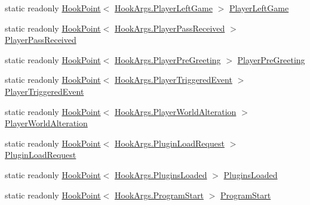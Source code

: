 \begin{DoxyCompactItemize}
static readonly \hyperlink{classOTA_1_1Plugin_1_1HookPoint}{Hook\+Point}$<$ \hyperlink{structOTA_1_1Plugin_1_1HookArgs_1_1PlayerLeftGame}{Hook\+Args.\+Player\+Left\+Game} $>$ \hyperlink{classOTA_1_1Plugin_1_1HookPoints_afa0b8296e5cf02f7938af5ab7c18f258}{Player\+Left\+Game}
\item 
static readonly \hyperlink{classOTA_1_1Plugin_1_1HookPoint}{Hook\+Point}$<$ \hyperlink{structOTA_1_1Plugin_1_1HookArgs_1_1PlayerPassReceived}{Hook\+Args.\+Player\+Pass\+Received} $>$ \hyperlink{classOTA_1_1Plugin_1_1HookPoints_adcafd753930f403b8fe614da8418ff92}{Player\+Pass\+Received}
\item 
static readonly \hyperlink{classOTA_1_1Plugin_1_1HookPoint}{Hook\+Point}$<$ \hyperlink{structOTA_1_1Plugin_1_1HookArgs_1_1PlayerPreGreeting}{Hook\+Args.\+Player\+Pre\+Greeting} $>$ \hyperlink{classOTA_1_1Plugin_1_1HookPoints_a8b500b8b4b78fdcc57640348951515c3}{Player\+Pre\+Greeting}
\item 
static readonly \hyperlink{classOTA_1_1Plugin_1_1HookPoint}{Hook\+Point}$<$ \hyperlink{structOTA_1_1Plugin_1_1HookArgs_1_1PlayerTriggeredEvent}{Hook\+Args.\+Player\+Triggered\+Event} $>$ \hyperlink{classOTA_1_1Plugin_1_1HookPoints_ab1ad9a9df05b219709cc66785f449b40}{Player\+Triggered\+Event}
\item 
static readonly \hyperlink{classOTA_1_1Plugin_1_1HookPoint}{Hook\+Point}$<$ \hyperlink{structOTA_1_1Plugin_1_1HookArgs_1_1PlayerWorldAlteration}{Hook\+Args.\+Player\+World\+Alteration} $>$ \hyperlink{classOTA_1_1Plugin_1_1HookPoints_ae335de5d246df52d77acacdb4e002211}{Player\+World\+Alteration}
\item 
static readonly \hyperlink{classOTA_1_1Plugin_1_1HookPoint}{Hook\+Point}$<$ \hyperlink{structOTA_1_1Plugin_1_1HookArgs_1_1PluginLoadRequest}{Hook\+Args.\+Plugin\+Load\+Request} $>$ \hyperlink{classOTA_1_1Plugin_1_1HookPoints_a8f0929d30473ae544caa811043d21538}{Plugin\+Load\+Request}
\item 
static readonly \hyperlink{classOTA_1_1Plugin_1_1HookPoint}{Hook\+Point}$<$ \hyperlink{structOTA_1_1Plugin_1_1HookArgs_1_1PluginsLoaded}{Hook\+Args.\+Plugins\+Loaded} $>$ \hyperlink{classOTA_1_1Plugin_1_1HookPoints_a8cc870a9109fa2715d0f34133c33c36c}{Plugins\+Loaded}
\item 
static readonly \hyperlink{classOTA_1_1Plugin_1_1HookPoint}{Hook\+Point}$<$ \hyperlink{structOTA_1_1Plugin_1_1HookArgs_1_1ProgramStart}{Hook\+Args.\+Program\+Start} $>$ \hyperlink{classOTA_1_1Plugin_1_1HookPoints_aea9677cc5ed1ddbfca86ee8bfe217af0}{Program\+Start}
\item 

\end{DoxyCompactItemize}
